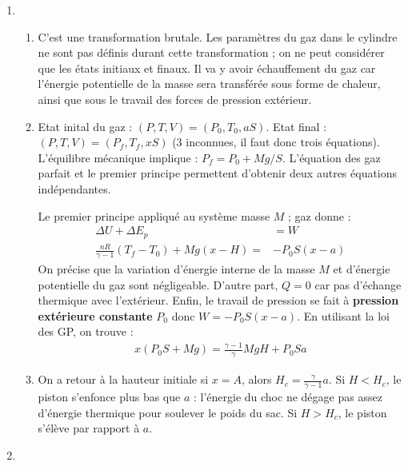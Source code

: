 \begin{correction}

\begin{enumerate}

\item

\begin{enumerate}

\item C'est une transformation brutale. Les paramètres du gaz dans le cylindre ne sont pas définis durant cette transformation ; on ne peut considérer que les états initiaux et finaux. Il va y avoir échauffement du gaz car l'énergie potentielle de la masse sera transférée sous forme de chaleur, ainsi que sous le travail des forces de pression extérieur.

\item Etat inital du gaz : $(P,T,V) =(P_0,T_0,aS)$. Etat final : $(P,T,V) =(P_f,T_f,xS)$ (3 inconnues, il faut donc trois équations). L'équilibre mécanique implique : $P_f=P_0+Mg/S$. L'équation des gaz parfait et le premier principe permettent d'obtenir deux autres équations indépendantes. 

Le premier principe appliqué au système {masse $M$ ; gaz} donne :
\begin{align*}
	\Delta U + \Delta E_p &= W \\
	\frac{nR}{\gamma-1}(T_f-T_0)+Mg(x-H)=&-P_0S(x-a)
\end{align*}
On précise que la variation d'énergie interne de la masse $M$ et d'énergie potentielle du gaz sont négligeable. D'autre part, $Q=0$ car pas d'échange thermique avec l'extérieur. Enfin, le travail de pression se fait à \textbf{pression extérieure constante} $P_0$ donc $W=-P_0S(x-a)$. En utilisant la loi des GP, on trouve :
\begin{align*}
	x(P_0S+Mg)=\frac{\gamma-1}{\gamma}MgH+P_0Sa
\end{align*}

\item On a retour à la hauteur initiale si $x=A$, alors $H_c=\frac{\gamma}{\gamma-1}a$. Si $H<H_c$, le piston s'enfonce plus bas que $a$ : l'énergie du choc ne dégage pas assez d'énergie thermique pour soulever le poids du sac. Si $H>H_c$, le piston s'élève par rapport à $a$.

\end{enumerate}

\item

\begin{enumerate}


\end{enumerate}
\end{enumerate}
\end{correction}
